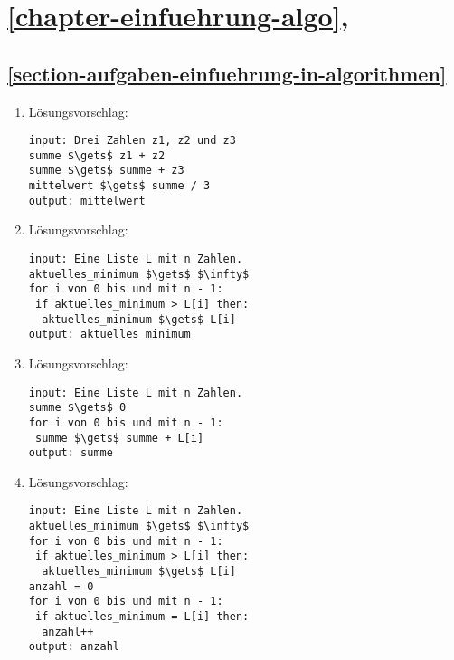 \section{\autoref{chapter-einfuehrung-algo}, }

\subsection*{\ref{section-aufgaben-einfuehrung-in-algorithmen} }

\begin{enumerate}

\item Lösungsvorschlag:

\begin{lstlisting}[language=pseudocode, caption={Algorithmus für das Problem \protect\autoref{problem-durchschnitt-3-zahlen}}, label={lst-algo-durchschnitt-3-zahlen}]
input: Drei Zahlen z1, z2 und z3
summe $\gets$ z1 + z2
summe $\gets$ summe + z3
mittelwert $\gets$ summe / 3
output: mittelwert
\end{lstlisting}

\item Lösungsvorschlag:

\begin{lstlisting}[language=pseudocode, caption={Algorithmus für das Problem \protect\autoref{problem-minimum-n-zahlen}}, label={lst-algo-minimum-n-zahlen}]
input: Eine Liste L mit n Zahlen.
aktuelles_minimum $\gets$ $\infty$
for i von 0 bis und mit n - 1:
 if aktuelles_minimum > L[i] then:
  aktuelles_minimum $\gets$ L[i]
output: aktuelles_minimum
\end{lstlisting}

\item Lösungsvorschlag:

\begin{lstlisting}[language=pseudocode, caption={Algorithmus für das Problem \protect\autoref{problem-addieren-n-zahlen}}, label={lst-algo-addieren-n-zahlen}]
input: Eine Liste L mit n Zahlen.
summe $\gets$ 0
for i von 0 bis und mit n - 1:
 summe $\gets$ summe + L[i]
output: summe
\end{lstlisting}

\newpage

\item Lösungsvorschlag:

\begin{lstlisting}[language=pseudocode, caption={Algorithmus für das Problem \protect\autoref{problem-anzahl-minima-n-zahlen}}, label={lst-algo-anzahl-minima-n-zahlen}]
input: Eine Liste L mit n Zahlen.
aktuelles_minimum $\gets$ $\infty$
for i von 0 bis und mit n - 1:
 if aktuelles_minimum > L[i] then:
  aktuelles_minimum $\gets$ L[i]
anzahl = 0
for i von 0 bis und mit n - 1:
 if aktuelles_minimum = L[i] then:
  anzahl++ 
output: anzahl
\end{lstlisting}

\end{enumerate}